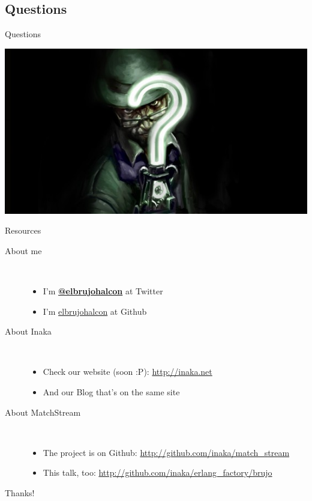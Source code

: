 \documentclass[utf8,hyperref={colorlinks=true}]{beamer}
\begin{document}
\subsection{Questions}
\begin{frame}{Questions}
	\begin{center}
		\includegraphics[width=\textwidth]{img/theriddler.jpg}
	\end{center}
\end{frame}
\begin{frame}{Resources}
	\begin{description}
		\item[About me]~\\
			\begin{itemize}
				\item I'm \textbf{\href{http://twitter.com/elbrujohalcon}{@elbrujohalcon}} at Twitter
				\item I'm \href{http://github.com/elbrujohalcon}{elbrujohalcon} at Github
			\end{itemize}
		\item[About Inaka]~\\
			\begin{itemize}
				\item Check our website (soon :P): \href{http://inakanetworks.com}{http://inaka.net}
				\item And our Blog that's on the same site
			\end{itemize}
		\item[About MatchStream]~\\
			\begin{itemize}
				\item The project is on Github: \href{http://github.com/inaka/match\_stream}{http://github.com/inaka/match\_stream}
				\item This talk, too: \href{http://github.com/inaka/erlang\_factory/brujo}{http://github.com/inaka/erlang\_factory/brujo}
			\end{itemize}
	\end{description}
\end{frame}

\appendix

\begin{frame}
	\begin{center}
		{\Huge Thanks!}
	\end{center}
\end{frame}
\end{document}
